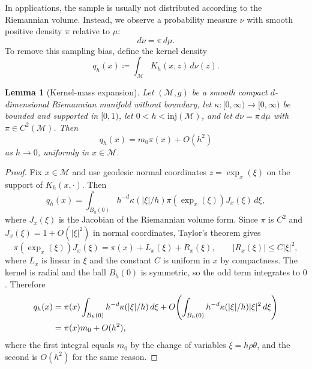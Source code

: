 \documentclass[a4paper,11pt, DIV=10]{scrartcl}
\numberwithin{equation}{section}
\newtheorem{lemma}[theorem]{Lemma}
\theoremstyle{definition}
\theoremstyle{remark}
\newcommand{\mc}[1]{\mathcal{#1}}
\begin{document}
In applications, the sample is usually not distributed according to the Riemannian volume. Instead, we observe a probability measure $\nu$ with smooth positive density $\pi$ relative to $\mu$:
\begin{equation}
d\nu=\pi\,d\mu.
\end{equation}
To remove this sampling bias, define the kernel density
\begin{equation}
q_h(x)\coloneq \int_{\mc{M}} K_h(x,z)\,d\nu(z).
\end{equation}
\begin{lemma}[Kernel-mass expansion]
\label{lem:kernel-mass-expansion}
Let $(\mc{M},g)$ be a smooth compact $d$-dimensional Riemannian manifold without boundary, let $\kappa\colon [0,\infty)\to [0,\infty)$ be bounded and supported in $[0,1)$, let $0<h<\mathrm{inj}(\mc{M})$, and let $d\nu=\pi\,d\mu$ with $\pi\in C^2(\mc{M})$. Then
\begin{equation}
\label{eq:kernel-mass-expansion}
q_h(x)=m_0\pi(x)+O(h^2)
\end{equation}
as $h\to 0$, uniformly in $x\in \mc{M}$.
\end{lemma}
\begin{proof}
Fix $x\in \mc{M}$ and use geodesic normal coordinates $z=\exp_x(\xi)$ on the support of $K_h(x,\cdot)$. Then
\begin{equation}
\label{eq:q-expansion-normal-coordinates}
q_h(x)
=
\int_{B_h(0)}
h^{-d}\kappa(|\xi|/h)\pi(\exp_x(\xi))J_x(\xi)\,d\xi,
\end{equation}
where $J_x(\xi)$ is the Jacobian of the Riemannian volume form. Since $\pi$ is $C^2$ and $J_x(\xi)=1+O(|\xi|^2)$ in normal coordinates, Taylor's theorem gives
\begin{equation}
\pi(\exp_x(\xi))J_x(\xi)
=
\pi(x)+L_x(\xi)+R_x(\xi),
\qquad
|R_x(\xi)|\le C|\xi|^2,
\end{equation}
where $L_x$ is linear in $\xi$ and the constant $C$ is uniform in $x$ by compactness. The kernel is radial and the ball $B_h(0)$ is symmetric, so the odd term integrates to $0$. Therefore
\begin{align}
q_h(x)
&=
\pi(x)\int_{B_h(0)} h^{-d}\kappa(|\xi|/h)\,d\xi
+ O\!\left(\int_{B_h(0)} h^{-d}\kappa(|\xi|/h)|\xi|^2\,d\xi\right) \notag \\
&=
\pi(x)m_0 + O(h^2),
\end{align}
where the first integral equals $m_0$ by the change of variables $\xi=h\rho\theta$, and the second is $O(h^2)$ for the same reason.
\end{proof}
\end{document}
